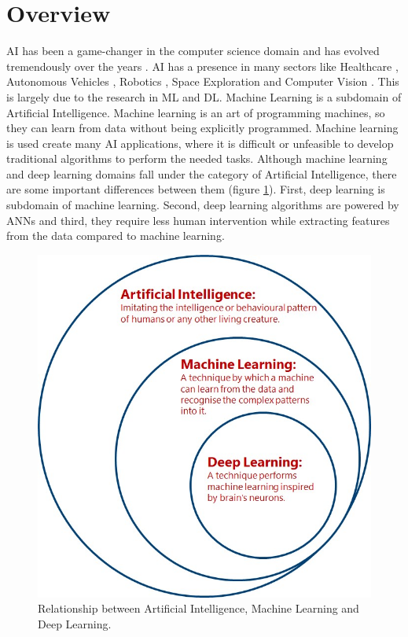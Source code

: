 \justifying
\setlength{\parskip}{1em}


\section{Overview}

\ac{AI} has been a game-changer in the computer science domain and has evolved tremendously over the years \cite{goodfellow2017deep}. \ac{AI} has a presence in many sectors like Healthcare \cite{Yu.2018}, Autonomous Vehicles \cite{Yurtsever_2020}, Robotics \cite{10.1007/978-3-642-82153-0_2}, Space Exploration \cite{Girimonte2007} and Computer Vision \cite{2020}. This is largely due to the research in \ac{ML} and \ac{DL}. Machine Learning is a subdomain of Artificial Intelligence. Machine learning is an art of programming machines, so they can learn from data without being explicitly programmed. Machine learning is used create many \ac{AI} applications, where it is difficult or unfeasible to develop traditional algorithms to perform the needed tasks. Although machine learning and deep learning domains fall under the category of Artificial Intelligence, there are some important differences between them (figure \ref{fig:deepLearningSubset}). First, deep learning is subdomain of machine learning. Second, deep learning algorithms are powered by \acp{ANN} and third, they require less human intervention while extracting features from the data compared to machine learning.


\begin{figure}[H]
        \begin{center}
 	    \includegraphics[scale=0.50]{images/Introduction/deeplearningsubset.jpg}
	    \caption[Relationship between Artificial Intelligence, Machine Learning and Deep Learning.]{Relationship between Artificial Intelligence, Machine Learning and Deep Learning.}
	    \label{fig:deepLearningSubset}
	    \end{center}
\end{figure}


